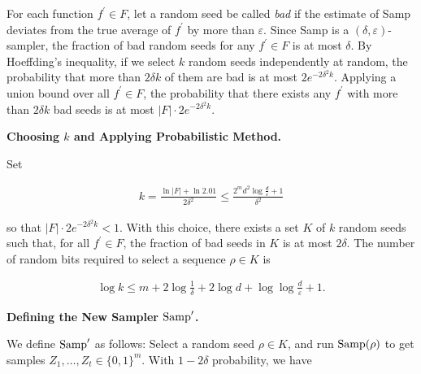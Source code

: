 For each function $f^{\prime}\in F$, let a random seed be called \emph{bad} if the estimate of Samp deviates from the true average of $f^{\prime}$ by more than $\varepsilon$. Since Samp is a $(\delta,\varepsilon)$-sampler, the fraction of bad random seeds for any $f^{\prime}\in F$ is at most $\delta$. By Hoeffding’s inequality, if we select $k$ random seeds independently at random, the probability that more than $2\delta k$ of them are bad is at most $2e^{-2\delta^{2}k}$.
Applying a union bound over all $f^{\prime}\in F$, the probability that there exists any $f^{\prime}$ with more than $2\delta k$ bad seeds is at most $\left|F\right|\cdot 2e^{-2\delta^{2}k}$.\par





\par\medskip\noindent\textbf{Choosing $k$ and Applying Probabilistic Method.}\par




Set\par


\[\begin{gathered}
k=\frac{\ln|F|+\ln 2.01}{2\delta^{2}}\leq\frac{2^{m}d^{2}\log\frac{d}{\varepsilon}+1}{\delta^{2}}
\end{gathered}\]


so that $|F|\cdot 2e^{-2\delta^{2}k}<1$. With this choice, there exists a set $K$ of $k$ random seeds such that, for all $f^{\prime}\in F$, the fraction of bad seeds in $K$ is at most $2\delta$. The number of random bits required to select a sequence $\rho\in K$ is\par


\[\begin{gathered}
\log k\leq m+2\log\frac{1}{\delta}+2\log d+\log\log\frac{d}{\varepsilon}+1.
\end{gathered}\]





\par\medskip\noindent\textbf{Defining the New Sampler $\textup{{Samp}}^{\prime}$.}\par




We define $\textup{{Samp}}^{\prime}$ as follows: Select a random seed $\rho\in K$, and run $\textup{{Samp}}(\rho)$ to get samples $Z_{1},\dots,Z_{t}\in\{0,1\}^{m}$. With $1-2\delta$ probability, we have\par


